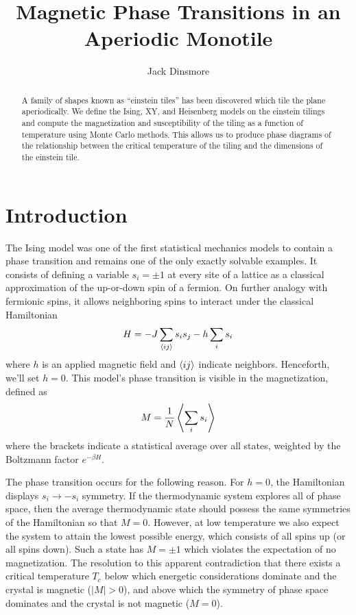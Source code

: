 \documentclass[
  amsmath,
  amssymb,
  aps,
  twocolumn,
  nofootinbib,
  nolongbibliography,
  floatfix,
]{revtex4-2}
\begin{document}
\title{Magnetic Phase Transitions in an Aperiodic Monotile}
\author{Jack Dinsmore}

\begin{abstract}
  A family of shapes known as ``einstein tiles'' has been discovered which tile the plane aperiodically. We define the Ising, XY, and Heisenberg models on the einstein tilings and compute the magnetization and susceptibility of the tiling as a function of temperature using Monte Carlo methods. This allows us to produce phase diagrams of the relationship between the critical temperature of the tiling and the dimensions of the einstein tile.
\end{abstract}

\maketitle

\section{Introduction}
The Ising model was one of the first statistical mechanics models to contain a phase transition and remains one of the only exactly solvable examples. It consists of defining a variable $s_i = \pm 1$ at every site of a lattice as a classical approximation of the up-or-down spin of a fermion. On further analogy with fermionic spins, it allows neighboring spins to interact under the classical Hamiltonian
\begin{equation}
  H = -J \sum_{\braket{ij}} s_i s_j - h \sum_i s_i
  \label{eqn:ising}
\end{equation}
where $h$ is an applied magnetic field and $\braket{ij}$ indicate neighbors. Henceforth, we'll set $h=0$. This model's phase transition is visible in the magnetization, defined as
\begin{equation}
  M = \frac{1}{N}\Braket{\sum_{i} s_i}
  \label{eqn:magnetization}
\end{equation}
where the brackets indicate a statistical average over all states, weighted by the Boltzmann factor $e^{-\beta H}$.

The phase transition occurs for the following reason. For $h=0$, the Hamiltonian displays $s_i\rightarrow -s_i$ symmetry. If the thermodynamic system explores all of phase space, then the average thermodynamic state should possess the same symmetries of the Hamiltonian so that $M=0$. However, at low temperature we also expect the system to attain the lowest possible energy, which consists of all spins up (or all spins down). Such a state has $M =\pm 1$ which violates the expectation of no magnetization. The resolution to this apparent contradiction that there exists a critical temperature $T_c$ below which energetic considerations dominate and the crystal is magnetic ($|M|>0$), and above which the symmetry of phase space dominates and the crystal is not magnetic ($M = 0$).
\end{document}
